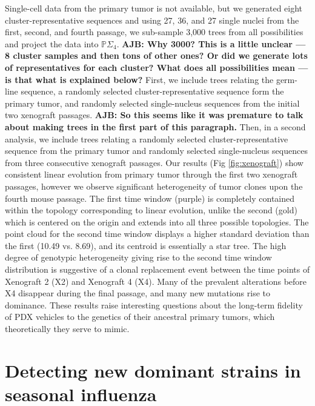 \documentclass[a4paper,11pt]{article}
\begin{document}
Single-cell data from the primary tumor is not available, but we
generated eight cluster-representative sequences and using 27, 36, and
27 single nuclei from the first, second, and fourth passage, we
sub-sample 3,000 trees from all possibilities and project the data
into $\mathbb{P}\Sigma_4 $.
{\bf AJB: Why 3000?  This is a little unclear --- 8 cluster samples
  and then tons of other ones?  Or did we generate lots of
  representatives for each cluster?  What does all possibilities mean
  --- is that what is explained below?}
First, we include trees relating the germ-line sequence, a randomly
selected cluster-representative sequence form the primary tumor, and
randomly selected single-nucleus sequences from the initial two
xenograft passages.
{\bf AJB: So this seems like it was premature to talk about making
  trees in the first part of this paragraph.}
Then, in a second analysis, we include trees relating a randomly selected cluster-representative sequence from the primary tumor and randomly selected single-nucleus sequences from three consecutive xenograft passages.
Our results (Fig \ref{fig:xenograft}) show consistent linear evolution from primary tumor through the first two xenograft passages, however we observe significant heterogeneity of tumor clones upon the fourth mouse passage.
The first time window (purple) is completely contained within the topology corresponding to linear evolution, unlike the second (gold) which is centered on the origin and extends into all three possible topologies.
The point cloud for the second time window displays a higher standard deviation than the first (10.49 vs. 8.69), and its centroid is essentially a star tree.
The high degree of genotypic heterogeneity giving rise to the second time window distribution is suggestive of a clonal replacement event between the time points of Xenograft 2 (X2) and Xenograft 4 (X4).
Many of the prevalent alterations before X4 disappear during the final passage, and many new mutations rise to dominance.
These results raise interesting questions about the long-term fidelity of PDX vehicles to the genetics of their ancestral primary tumors, which theoretically they serve to mimic.


\section{Detecting new dominant strains in seasonal influenza}\label{sec:flu}
\end{document}
